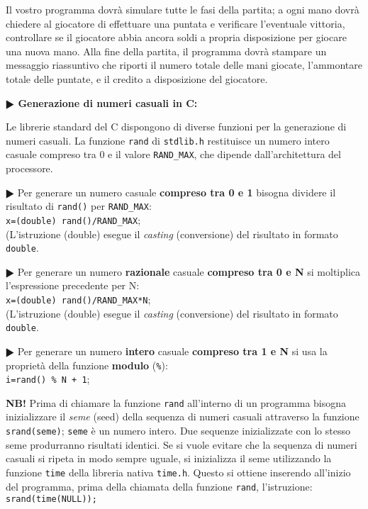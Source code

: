 \documentclass[11pt]{article}
\begin{document}
Il vostro programma dovr\`a simulare tutte le fasi della partita; a ogni mano dovr\`a chiedere al giocatore di effettuare una puntata e verificare l'eventuale vittoria, controllare se il giocatore abbia ancora soldi a propria disposizione per giocare una nuova mano. Alla fine della partita, il programma dovr\`a stampare un messaggio riassuntivo che riporti il numero totale delle mani giocate, l'ammontare totale delle puntate, e il credito a disposizione del giocatore.



\vspace{4mm}

\begin{mdframed}[backgroundcolor=gray!10]
\textbf{$\RHD$ Generazione di numeri casuali in C:}
 
Le librerie standard del C dispongono di diverse funzioni per la generazione di numeri casuali.
La funzione \texttt{rand} di \texttt{stdlib.h} restituisce un numero intero casuale compreso tra 0 e il valore \texttt{RAND\_MAX}, che dipende dall'architettura del processore.

\textbf{$\RHD$} Per generare un numero casuale {\bf compreso tra 0 e 1} bisogna dividere il risultato di \texttt{rand()} per
\texttt{RAND\_MAX}:
\\
\texttt{x=(double) rand()/{RAND\_MAX}};
\\
(L'istruzione (double) esegue il {\em casting} (conversione) del risultato in formato \texttt{double}.

\textbf{$\RHD$} Per generare un numero {\bf razionale} casuale {\bf compreso tra 0 e N} si moltiplica l'espressione precedente per N: 
\\
\texttt{x=(double) rand()/{RAND\_MAX}*N};
\\
(L'istruzione (double) esegue il {\em casting} (conversione) del risultato in formato \texttt{double}.

\textbf{$\RHD$} Per generare un numero {\bf intero} casuale {\bf compreso tra 1 e N} si usa la propriet\`a della funzione 
{\bf modulo} (\texttt{\%}):  
\\
\texttt{i=rand() \% N + 1};

{\bf NB!} Prima di chiamare la funzione \texttt{rand} all'interno di un programma bisogna inizializzare il {\em seme} (seed) della sequenza di numeri casuali attraverso la funzione \texttt{srand(seme)}; \texttt{seme} \`e un numero intero. Due sequenze inizializzate con lo stesso seme produrranno risultati identici. Se si vuole evitare che la sequenza di numeri casuali si ripeta in modo sempre uguale, si inizializza il seme utilizzando la funzione \texttt{time} della libreria
nativa \texttt{time.h}. Questo si ottiene inserendo all'inizio del programma, prima della chiamata della funzione \texttt{rand}, l'istruzione:
\\
\texttt{srand(time(NULL));}
\\
\end{mdframed}

 
\end{document}
